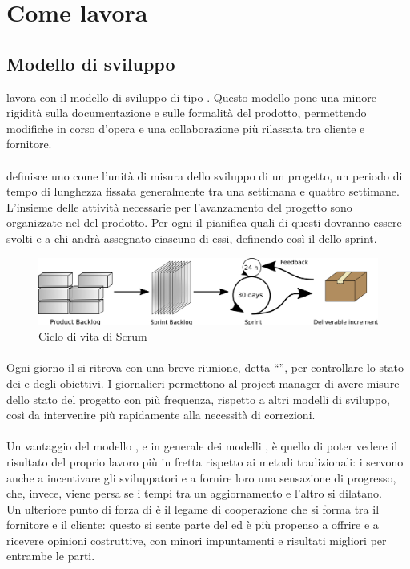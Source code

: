 \section{Come lavora}

   \subsection{Modello di sviluppo}
   \nomeAzienda{} lavora con il modello di sviluppo  di tipo . Questo modello pone una minore rigidità sulla documentazione e sulle formalità del prodotto, permettendo modifiche in corso d'opera e una collaborazione più rilassata tra cliente e fornitore.
   \paragraph*{}  definisce uno  come l'unità di misura dello sviluppo di un progetto, un periodo di tempo di lunghezza fissata generalmente tra una settimana e quattro settimane.
   L'insieme delle attività necessarie per l'avanzamento del progetto sono organizzate nel  del prodotto.
   Per ogni  il  pianifica quali di questi  dovranno essere svolti e a chi andrà assegnato ciascuno di essi, definendo così il  dello sprint.
   \begin{figure}[H]
      \centering
      \includegraphics[width=16.5cm]{immagini/scrum-redone}
      \caption[Ciclo di vita di Scrum]{Ciclo di vita di Scrum}
   \end{figure}
   \paragraph*{}
   Ogni giorno il  si ritrova con una breve riunione, detta ``'', per controllare lo stato dei  e degli obiettivi. I  giornalieri permettono al \gls{project manager} di avere misure dello stato del progetto con più frequenza, rispetto a altri modelli di sviluppo, così da intervenire più rapidamente alla necessità di correzioni.
   \paragraph*{}
   Un vantaggio del modello , e in generale dei modelli , è quello di poter vedere il risultato del proprio lavoro più in fretta rispetto ai metodi tradizionali: i  servono anche a incentivare gli sviluppatori e a fornire loro una sensazione di progresso, che, invece, viene persa se i tempi tra un aggiornamento e l'altro si dilatano.
   \\
   Un ulteriore punto di forza di  è il legame di cooperazione che si forma tra il fornitore e il cliente: questo si sente parte del  ed è più propenso a offrire e a ricevere opinioni costruttive, con minori impuntamenti e risultati migliori per entrambe le parti.
